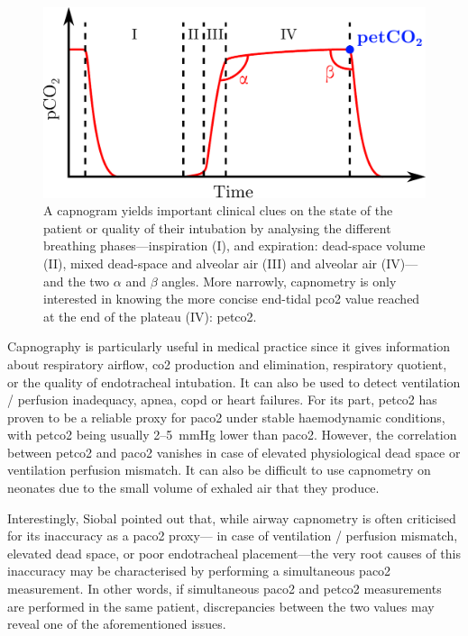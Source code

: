 \begin{figure}
	\centering
	\includegraphics[width=.80\linewidth]{1_main_matter/intro_figures/capnography_principle}
	\caption[Capnography \textit{vs} capnometry.]{A capnogram yields important clinical clues on the state of the patient or quality of their intubation by analysing the different breathing phases---inspiration (I), and expiration: dead-space volume (II), mixed dead-space and alveolar air (III) and alveolar air (IV)---and the two $\alpha$ and $\beta$ angles\cite{capnography_gravenstein, capnography_site}. More narrowly, capnometry is only interested in knowing the more concise end-tidal \gls{pco2} value reached at the end of the plateau (IV): \gls{petco2}.}
	\label{fig:capnometry_principle}
\end{figure}

Capnography is particularly useful in medical practice since it gives information about respiratory airflow, \gls{co2} production and elimination, respiratory quotient, or the quality of endotracheal intubation. It can also be used to detect ventilation / perfusion inadequacy, apnea, \gls{copd} or heart failures\cite{siobal2016, long2017}. For its part, \gls{petco2} has proven to be a reliable proxy for \gls{paco2} under stable haemodynamic conditions, with \gls{petco2} being usually 2--5~mmHg lower than \gls{paco2}\cite{siobal2016}. However, the correlation between \gls{petco2} and \gls{paco2} vanishes in case of elevated physiological dead space or ventilation perfusion mismatch\cite{wagner2015, amaddeo2016}. It can also be difficult to use capnometry on neonates due to the small volume of exhaled air that they produce\cite{hochwald2019}.

Interestingly, Siobal \etal{}\cite{siobal2016} pointed out that, while airway capnometry is often criticised for its inaccuracy as a \gls{paco2} proxy---\eg{} in case of ventilation / perfusion mismatch, elevated dead space, or poor endotracheal placement---the very root causes of this inaccuracy may be characterised by performing a simultaneous \gls{paco2} measurement. In other words, if simultaneous \gls{paco2} and \gls{petco2} measurements are performed in the same patient, discrepancies between the two values may reveal one of the aforementioned issues.

